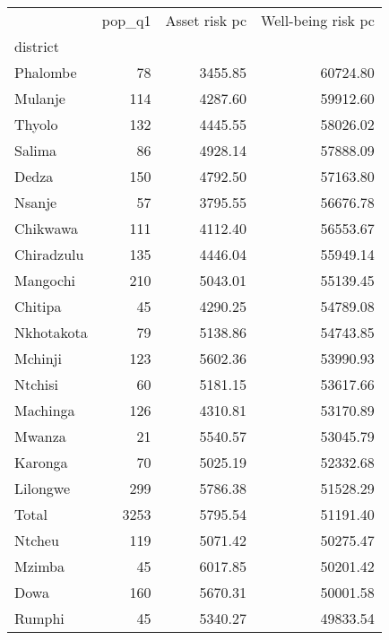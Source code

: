 \begin{tabular}{lrrr}
\toprule
{} &  pop\_q1 &  Asset risk pc &  Well-being risk pc \\
district       &         &                &                     \\
\midrule
Phalombe       &      78 &        3455.85 &            60724.80 \\
Mulanje        &     114 &        4287.60 &            59912.60 \\
Thyolo         &     132 &        4445.55 &            58026.02 \\
Salima         &      86 &        4928.14 &            57888.09 \\
Dedza          &     150 &        4792.50 &            57163.80 \\
Nsanje         &      57 &        3795.55 &            56676.78 \\
Chikwawa       &     111 &        4112.40 &            56553.67 \\
Chiradzulu     &     135 &        4446.04 &            55949.14 \\
Mangochi       &     210 &        5043.01 &            55139.45 \\
Chitipa        &      45 &        4290.25 &            54789.08 \\
Nkhotakota     &      79 &        5138.86 &            54743.85 \\
Mchinji        &     123 &        5602.36 &            53990.93 \\
Ntchisi        &      60 &        5181.15 &            53617.66 \\
Machinga       &     126 &        4310.81 &            53170.89 \\
Mwanza         &      21 &        5540.57 &            53045.79 \\
Karonga        &      70 &        5025.19 &            52332.68 \\
Lilongwe       &     299 &        5786.38 &            51528.29 \\
Total          &    3253 &        5795.54 &            51191.40 \\
Ntcheu         &     119 &        5071.42 &            50275.47 \\
Mzimba         &      45 &        6017.85 &            50201.42 \\
Dowa           &     160 &        5670.31 &            50001.58 \\
Rumphi         &      45 &        5340.27 &            49833.54 \\

\end{tabular}
